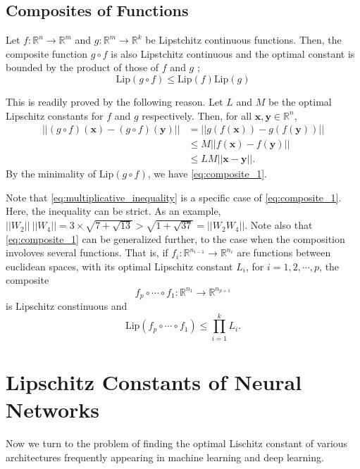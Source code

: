 \documentclass[12pt]{report}
\numberwithin{figure}{chapter}
\theoremstyle{plain}
\theoremstyle{definition}
\theoremstyle{corollary}
\theoremstyle{definition}
\theoremstyle{plain}
\theoremstyle{definition}
\theoremstyle{plain}
\newcommand\bx{\ensuremath{\boldsymbol x}}
\newcommand\by{\ensuremath{\boldsymbol y}}
\newcommand\lip{\ensuremath{\text{Lip}}}
\begin{document}
\section{Composites of Functions}
Let \(f:\mathbb R^n\to\mathbb R^m\) and \(g:\mathbb R^m\to\mathbb R^k\) be Lipstchitz continuous functions.
Then, the composite function \(g\circ f\) is also Lipstchitz continuous and the optimal constant is bounded by the product of those of \(f\) and \(g\) ; 
\begin{equation}\label{eq:composite_1}
\lip(g\circ f)\le\lip(f)\lip(g)
\end{equation}

This is readily proved by the following reason.
Let \(L\) and \(M\) be the optimal Lipschitz constants for \(f\) and \(g\) respectively.
Then, for all \(\bx,\by\in\mathbb R^n\),
\begin{align*}
||(g\circ f)(\bx)-(g\circ f)(\by)||
&=||g(f(\bx))-g(f(\by))||\\
&\le M||f(\bx)-f(\by)||\\
&\le LM||\bx-\by||.
\end{align*}
By the minimality of \(\lip(g\circ f)\), we have \eqref{eq:composite_1}.

Note that \eqref{eq:multiplicative_inequality} is a specific case of \eqref{eq:composite_1}.
Here, the inequality can be strict.
As an example, \(||W_2||\:||W_4||=3\times\sqrt{7+\sqrt{13}}>\sqrt{1+\sqrt{37}}=||W_2W_4||\).
Note also that \eqref{eq:composite_1} can be generalized further, to the case when the composition involoves several functions.
That is, if \(f_i:\mathbb R^{n_{i-1}}\to\mathbb R^{n_i}\) are  functions between euclidean spaces, with its optimal Lipschitz constant \(L_i\), for \(i=1,2,\cdots,p\), the composite
\[f_p\circ\cdots\circ f_1:\mathbb R^{n_1}\to\mathbb R^{n_{p+1}}\]
is Lipschitz constinuous and
\begin{equation}\label{eq:composite_2}
\lip(f_p\circ\cdots\circ f_1)\le\prod_{i=1}^kL_i.
\end{equation}

\chapter{Lipschitz Constants of Neural Networks}

Now we turn to the problem of finding the optimal Lischitz constant of various architectures frequently appearing in machine learning and deep learning.
\end{document}
